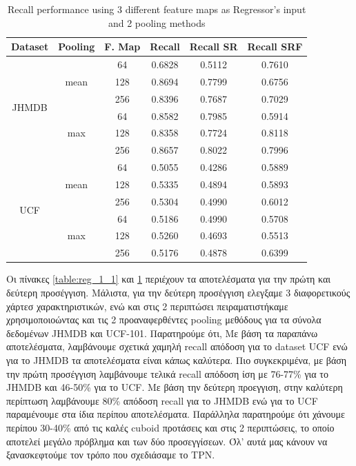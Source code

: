 \documentclass{report}
\begin{document}
\begin{table}[h]
  \centering
  \begin{tabular}{||c | c | c || c  c  c ||}
    \hline
    \textbf{Dataset} & \textbf{Pooling} & \textbf{F. Map} & \textbf{Recall} &  \textbf{ Recall SR}  &  \textbf{Recall SRF} \\
    \hline
    \multirow{6}{*}{JHMDB} & \multirow{3}{*}{mean} & 64 &  0.6828  & 0.5112  & 0.7610 \\
    \cline{3-6}
    {} & {} & 128 & 0.8694 & 0.7799 & 0.6756 \\
    \cline{3-6}
    {} & {} & 256 & 0.8396 & 0.7687 & 0.7029 \\
    \cline{2-6}
    {} & \multirow{3}{*}{max} & 64 &  0.8582 & 0.7985 & 0.5914\\
    \cline{3-6}
    {} & {} & 128 & 0.8358 & 0.7724 & 0.8118 \\
    \cline{3-6}
    {} & {} & 256 & 0.8657 & 0.8022 & 0.7996 \\
    \hline
    \multirow{6}{*}{UCF} & \multirow{3}{*}{mean} & 64 & 0.5055 & 0.4286 & 0.5889 \\
    \cline{3-6}
    {} & {} & 128 & 0.5335 & 0.4894 & 0.5893 \\
    \cline{3-6}
    {} & {} & 256 & 0.5304 & 0.4990 & 0.6012 \\
    \cline{2-6}
    {} & \multirow{3}{*}{max} & 64 & 0.5186 & 0.4990 & 0.5708 \\
    \cline{3-6}
    {} & {} & 128 & 0.5260 & 0.4693 & 0.5513 \\
    \cline{3-6}
    {} & {} & 256 & 0.5176 & 0.4878 & 0.6399 \\
    \hline

  \end{tabular}
  \caption{Recall performance using 3 different feature maps as Regressor's input and 2 pooling methods}
  \label{table:reg_1_2}
\end{table}

Οι πίνακες \ref{table:reg_1_1} και \ref{table:reg_1_2} περιέχουν τα αποτελέσματα για την πρώτη και δεύτερη προσέγγιση. Μάλιστα, για την δεύτερη προσέγγιση ελεγξαμε 3 διαφορετικούς χάρτεσ
χαρακτηριστικών, ενώ και στις 2 περιπτώσει πειραματιστήκαμε χρησιμοποιοώντας και τις 2 προαναφερθέντες pooling μεθόδους για τα σύνολα δεδομένων JHMDB και UCF-101. Παρατηρούμε ότι,
Με βάση τα παραπάνω αποτελέσματα, λαμβάνουμε σχετικά χαμηλή recall απόδοση για το dataset UCF ενώ για το JHMDB τα αποτελέσματα είναι κάπως καλύτερα. Πιο συγκεκριμένα, με βάση την πρώτη
προσέγγιση λαμβάνουμε τελικά recall απόδοση ίση με 76-77\% για το JHMDB και 46-50\% για το UCF. Με βάση την δεύτερη προεγγιση, στην καλύτερη περίπτωση λαμβάνουμε 80\% απόδοση recall για
το JHMDB ενώ για το UCF παραμένουμε στα ίδια περίπου αποτελέσματα. Παράλληλα παρατηρούμε ότι χάνουμε περίπου 30-40\% από τις καλές cuboid προτάσεις και στις 2 περιπτώσεις, το οποίο αποτελεί μεγάλο
πρόβλημα και των δύο προσεγγίσεων. Όλ' αυτά μας κάνουν να ξανασκεφτούμε τον τρόπο που σχεδιάσαμε το TPN.
\end{document}
